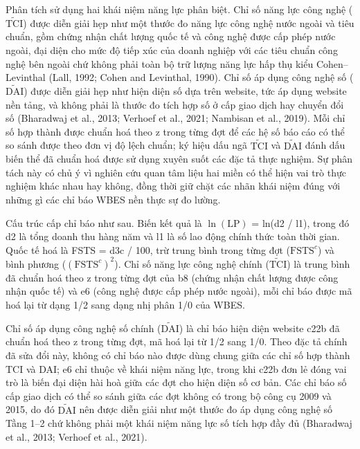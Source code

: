\documentclass[12pt,a4paper]{article}
\begin{document}
Phân tích sử dụng hai khái niệm năng lực phân biệt. Chỉ số năng lực công
nghệ (\(\tilde{\mathrm{TCI}}\)) được diễn giải hẹp như một thước đo năng
lực công nghệ nước ngoài và tiêu chuẩn, gồm chứng nhận chất lượng quốc
tế và công nghệ được cấp phép nước ngoài, đại diện cho mức độ tiếp xúc
của doanh nghiệp với các tiêu chuẩn công nghệ bên ngoài chứ không phải
toàn bộ trữ lượng năng lực hấp thụ kiểu Cohen--Levinthal (Lall, 1992;
Cohen and Levinthal, 1990). Chỉ số áp dụng công nghệ số
(\(\tilde{\mathrm{DAI}}\)) được diễn giải hẹp như hiện diện số dựa trên
website, tức áp dụng website nền tảng, và không phải là thước đo tích
hợp số ở cấp giao dịch hay chuyển đổi số (Bharadwaj et al., 2013;
Verhoef et al., 2021; Nambisan et al., 2019). Mỗi chỉ số hợp thành được
chuẩn hoá theo z trong từng đợt để các hệ số báo cáo có thể so sánh được
theo đơn vị độ lệch chuẩn; ký hiệu dấu ngã \(\tilde{\mathrm{TCI}}\) và
\(\tilde{\mathrm{DAI}}\) đánh dấu biến thể đã chuẩn hoá được sử dụng
xuyên suốt các đặc tả thực nghiệm. Sự phân tách này có chủ ý vì nghiên
cứu quan tâm liệu hai miền có thể hiện vai trò thực nghiệm khác nhau hay
không, đồng thời giữ chặt các nhãn khái niệm đúng với những gì các chỉ
báo WBES nền thực sự đo lường.

Cấu trúc cấp chỉ báo như sau. Biến kết quả là \(\ln(\mathrm{LP})\) =
ln(d2 / l1), trong đó d2 là tổng doanh thu hàng năm và l1 là số lao động
chính thức toàn thời gian. Quốc tế hoá là FSTS = d3c / 100, trừ trung
bình trong từng đợt (\(\mathrm{FSTS}^{c}\)) và bình phương
(\((\mathrm{FSTS}^{c})^2\)). Chỉ số năng lực công nghệ chính
(\(\tilde{\mathrm{TCI}}\)) là trung bình đã chuẩn hoá theo z trong từng
đợt của b8 (chứng nhận chất lượng được công nhận quốc tế) và e6 (công
nghệ được cấp phép nước ngoài), mỗi chỉ báo được mã hoá lại từ dạng 1/2
sang dạng nhị phân 1/0 của WBES.

Chỉ số áp dụng công nghệ số chính (\(\tilde{\mathrm{DAI}}\)) là chỉ báo
hiện diện website c22b đã chuẩn hoá theo z trong từng đợt, mã hoá lại từ
1/2 sang 1/0. Theo đặc tả chính đã sửa đổi này, không có chỉ báo nào
được dùng chung giữa các chỉ số hợp thành TCI và DAI; e6 chỉ thuộc về
khái niệm năng lực, trong khi c22b đơn lẻ đóng vai trò là biến đại diện
hài hoà giữa các đợt cho hiện diện số cơ bản. Các chỉ báo số cấp giao
dịch có thể so sánh giữa các đợt không có trong bộ công cụ 2009 và 2015,
do đó \(\tilde{\mathrm{DAI}}\) nên được diễn giải như một thước đo áp
dụng công nghệ số Tầng 1--2 chứ không phải một khái niệm năng lực số
tích hợp đầy đủ (Bharadwaj et al., 2013; Verhoef et al., 2021).
\end{document}
